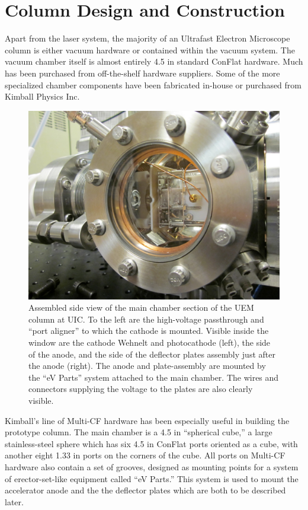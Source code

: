 
\section{Column Design and Construction}

Apart from the laser system, the majority of an Ultrafast Electron Microscope column is either vacuum hardware or contained within the vacuum system.
The vacuum chamber itself is almost entirely 4.5 in standard ConFlat hardware.
Much has been purchased from off-the-shelf hardware suppliers.
Some of the more specialized chamber components have been fabricated in-house or purchased from Kimball Physics Inc.

\begin{figure}
  \centering
  \includegraphics{chamber.jpg}
  \caption[Side view of main chamber]{
    Assembled side view of the main chamber section of the UEM column at UIC.
    To the left are the high-voltage passthrough and ``port aligner'' to which the cathode is mounted.
    Visible inside the window are the cathode Wehnelt and photocathode (left), the side of the anode, and the side of the deflector plates assembly just after the anode (right).
    The anode and plate-assembly are mounted by the ``eV Parts'' system attached to the main chamber.
    The wires and connectors supplying the voltage to the plates are also clearly visible.
  }
  \label{fig:chamber-pic}
\end{figure}

Kimball's line of Multi-CF hardware has been especially useful in building the prototype column.
The main chamber is a 4.5 in ``spherical cube,'' a large stainless-steel sphere which has six 4.5 in ConFlat ports oriented as a cube, with another eight 1.33 in ports on the corners of the cube.
All ports on Multi-CF hardware also contain a set of grooves, designed as mounting points for a system of erector-set-like equipment called ``eV Parts.''
This system is used to mount the accelerator anode and the the deflector plates which are both to be described later.



